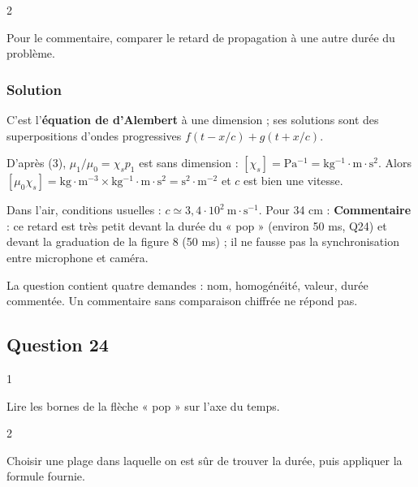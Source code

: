 \documentclass[11pt,a4paper]{article}
\newcommand{\equationajustee}[1]{%
  \sbox{\boiteequation}{$\displaystyle #1$}%
  \ifdim\wd\boiteequation>\linewidth
    \[\resizebox{\linewidth}{!}{\usebox{\boiteequation}}\]%
  \else
    \[#1\]%
  \fi}
\begin{document}
\begin{indication}{2}

Pour le commentaire, comparer le retard de propagation à une autre durée du problème.

\end{indication}

\hypertarget{solution-22}{%
\subsubsection{Solution}\label{solution-22}}

C'est l'\textbf{équation de d'Alembert} à une dimension ; ses solutions sont des superpositions d'ondes progressives \(f(t-x/c)+g(t+x/c)\).

D'après (3), \(\mu_1/\mu_0=\chi_sp_1\) est sans dimension : \([\chi_s]=\mathrm{Pa^{-1}}=\mathrm{kg^{-1}\cdot m\cdot s^2}\). Alors \([\mu_0\chi_s]=\mathrm{kg\cdot m^{-3}}\times\mathrm{kg^{-1}\cdot m\cdot s^2}=\mathrm{s^2\cdot m^{-2}}\) et \(c\) est bien une vitesse.

Dans l'air, conditions usuelles : \(\boxed{c\simeq3{,}4\cdot10^2\ \mathrm{m\cdot s^{-1}}}\). Pour 34 cm :
\equationajustee{\boxed{\Delta t_{prop}=\frac{0{,}34}{340}\simeq1\ \mathrm{ms}}}
\textbf{Commentaire} : ce retard est très petit devant la durée du « pop » (environ 50 ms, Q24) et devant la graduation de la figure 8 (50 ms) ; il ne fausse pas la synchronisation entre microphone et caméra.

\begin{piege}

La question contient quatre demandes : nom, homogénéité, valeur, durée commentée. Un commentaire sans comparaison chiffrée ne répond pas.

\end{piege}

\hypertarget{question-24}{%
\subsection{Question 24}\label{question-24}}

\begin{indication}{1}

Lire les bornes de la flèche « pop » sur l'axe du temps.

\end{indication}

\begin{indication}{2}

Choisir une plage dans laquelle on est sûr de trouver la durée, puis appliquer la formule fournie.

\end{indication}
\end{document}
